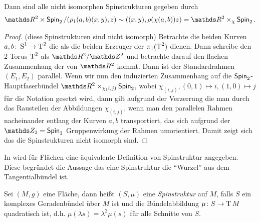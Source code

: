 \begin{Bsp}
\begin{enumerate}[(1)]
  Dann sind alle nicht isomorphen Spinstrukturen gegeben durch  
  \begin{gather*}
  	\R^2 \times \spin_2 / (\rho_1(a,b)(x,y),z) \sim ((x,y),\rho(\chi(a,b))z) = \R^2 \times_\chi \spin_2.
  \end{gather*}
  \begin{proof}(diese Spinstrukturen sind nicht isomorph)
  	Betrachte die beiden Kurven $ a,b \colon \operatorname{S}^1 \rightarrow \operatorname{T}^2$ die
  	als die beiden Erzeuger der $ \pi_1(\operatorname{T}^2) $ dienen. 
  	Dann schreibe den $ 2 $-Torus $ \operatorname{T}^2 $ als $ \R^2 / \Z^2 $
  	und betrachte darauf den flachen Zusammenhang der von
  	$ \R^2 $ kommt. Dann ist der Standardrahmen $ (E_1,E_2) $ parallel. Wenn wir nun den induzierten Zusammenhang auf
  	die $ \operatorname{\mathsf{Spin}}_2 $-Hauptfaserbündel $ \R^2 \times_{\chi_(i,j)} \spin_2 $, wobei $ \chi_(i,j), (0,1) \mapsto i , (1,0) \mapsto j $
  	für die Notation gesetzt wird, dann gilt aufgrund der Verzerrung
  	die man durch das Rausteilen der Abbildungen $ \chi_(i,j) $,
  	wenn man den parallelen Rahmen nacheinander entlang der Kurven
  	$ a,b $ transportiert, das sich aufgrund der $ \Z_2=\spin_1 $
  	Gruppenwirkung der Rahmen umorientiert. Damit zeigt sich
  	das die Spinstrukturen nicht isomorph sind.
  	
  	
  \end{proof}
  
	\end{enumerate}
\end{Bsp}

In \cite{KS96} wird für Flächen eine äquivalente Definition
von Spinstruktur angegeben. Diese begründet die Aussage das
eine Spinstruktur die \enquote{Wurzel} aus dem Tangentialbündel ist.

\begin{Def}\label{DefSpin_KS}
	Sei $ (M,g) $ eine Fläche, dann heißt $ (S,\mu) $ eine
	\textit{Spinstruktur} auf $ M $, falls $ S $ ein komplexes Geradenbündel
	über $ M $ ist und die Bündelabbildung $ \mu \colon S \rightarrow \operatorname{T} M $ quadratisch	ist, d.h. $ \mu(\lambda s) = \lambda^2 \mu(s) $ für alle Schnitte
	von $ S $.
\end{Def}

